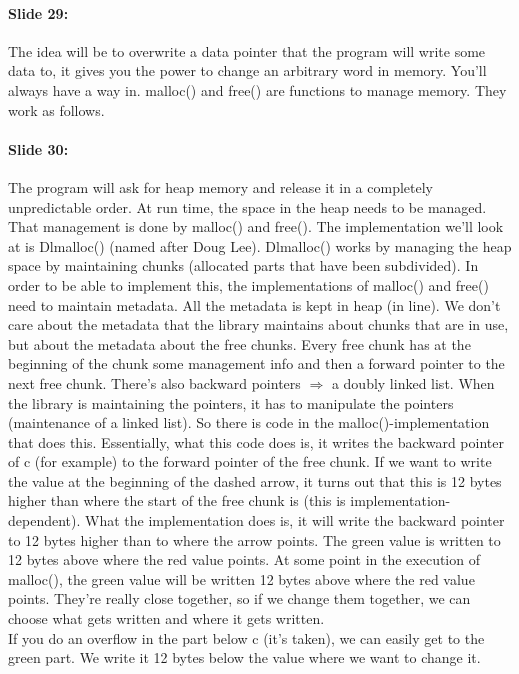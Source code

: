 \documentclass[10pt,a4paper]{report}
\begin{document}
\paragraph{Slide 29:} The idea will be to overwrite a data pointer that the program will write some data to, it gives you the power to change an arbitrary word in memory. You'll always have a way in. malloc() and free() are functions to manage memory. They work as follows.

\paragraph{Slide 30:} The program will ask for heap memory and release it in a completely unpredictable order. At run time, the space in the heap needs to be managed. That management is done by malloc() and free(). The implementation we'll look at is Dlmalloc() (named after Doug Lee). Dlmalloc() works by managing the heap space by maintaining chunks (allocated parts that have been subdivided). In order to be able to implement this, the implementations of malloc() and free() need to maintain metadata. All the metadata is kept in heap (in line). We don't care about the metadata that the library maintains about chunks that are in use, but about the metadata about the free chunks. Every free chunk has at the beginning of the chunk some management info and then a forward pointer to the next free chunk. There's also backward pointers $\Rightarrow$ a doubly linked list. When the library is maintaining the pointers, it has to manipulate the pointers (maintenance of a linked list). So there is code in the malloc()-implementation that does this. Essentially, what this code does is, it writes the backward pointer of c (for example) to the forward pointer of the free chunk. If we want to write the value at the beginning of the dashed arrow, it turns out that this is 12 bytes higher than where the start of the free chunk is (this is implementation-dependent). What the implementation does is, it will write the backward pointer to 12 bytes higher than to where the arrow points. The green value is written to 12 bytes above where the red value points. At some point in the execution of malloc(), the green value will be written 12 bytes above where the red value points. They're really close together, so if we change them together, we can choose what gets written and where it gets written.\\
If you do an overflow in the part below c (it's taken), we can easily get to the green part. We write it 12 bytes below the value where we want to change it.
\end{document}
